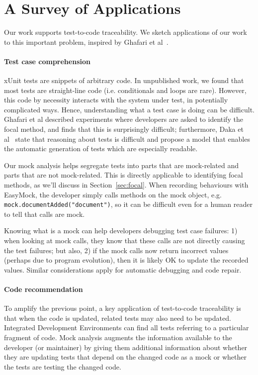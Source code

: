 \section{A Survey of Applications}
\label{sec:applications}

Our work supports test-to-code traceability. 
We sketch applications of our work to this important problem,
inspired by Ghafari et al~\cite{ghafari15:_autom}.

\paragraph{Test case comprehension} xUnit tests are snippets of arbitrary
code. In unpublished work, we found that most tests are
straight-line code (i.e. conditionals and loops are rare). 
However, this code by necessity interacts with
the system under test, in potentially complicated ways. Hence,
understanding what a test case is doing can be difficult. Ghafari et
al described experiments where developers are asked to identify the
focal method, and finds that this is surprisingly difficult;
furthermore, Daka et al~\cite{daka15:_model_readab_improv_unit_tests}
state that reasoning about tests is difficult and propose a model that
enables the automatic generation of tests which are especially
readable.

Our mock analysis helps segregate tests into parts that are
mock-related and parts that are not mock-related. This is directly applicable
to identifying focal methods, as we'll discuss in Section~\ref{sec:focal}.
When recording behaviours with EasyMock,
the developer simply calls methods on the mock object, e.g. 
\texttt{mock.documentAdded("document")}, so it can be difficult even for a
human reader to tell that calls are mock.

Knowing what is a mock can help developers debugging test case
failures: 1) when looking at
mock calls, they know that these calls are not
directly causing the test failures; but also, 2) if the mock calls
now return incorrect values (perhaps due to program evolution),
then it is likely OK to update the recorded values. 
Similar considerations
apply for automatic debugging and code repair.

\paragraph{Code recommendation}
To amplify the previous point, a key application of test-to-code
traceability is that when the code is updated, related tests may also
need to be updated. Integrated Development Environments can find
all tests referring to a particular fragment of code. Mock analysis
augments the information available to the developer (or maintainer) by
giving them additional information about whether they are updating
tests that depend on the changed code as a mock or whether the tests
are testing the changed code.

